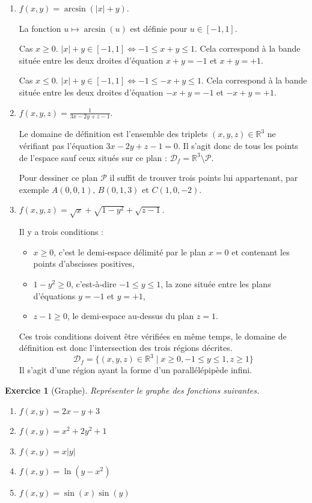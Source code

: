 \documentclass[11pt,a4paper]{article}
\newcommand{\Rr}{\mathbb{R}} \newcommand{\R}{\mathbb{R}}
\renewcommand{\ge}{\geqslant} \renewcommand{\geq}{\geqslant}
\renewcommand{\le}{\leqslant} \renewcommand{\leq}{\leqslant}
\theoremstyle{exostyle}
\newtheorem{exo}{Exercice}
\newcommand{\exercice}[1]{} \newcommand{\finexercice}{}
\newcommand{\enonce}{\begin{exo}} \newcommand{\finenonce}{\end{exo}}
\begin{document}
\begin{enumerate}
	\item $f(x,y) = \arcsin(|x| + y)$.	
	
	La fonction $u \mapsto \arcsin(u)$ est définie pour $u \in [-1,1]$.
	
	Cas $x \ge 0$. $|x| + y \in [-1,1] \iff -1 \le x+y \le 1$. Cela correspond à la bande située entre les deux droites d'équation $x+y=-1$ et $x+y=+1$.
	
	Cas $x \le 0$. $|x| + y \in [-1,1] \iff -1 \le -x+y \le 1$. Cela correspond à la bande située entre les deux droites d'équation $-x+y=-1$ et $-x+y=+1$.	
	
	
	
	
	\item $f(x,y,z) = \frac{1}{3x-2y+z-1}$.
	
	Le domaine de définition est l'ensemble des triplets $(x,y,z) \in \Rr^3$ ne vérifiant pas l'équation $3x-2y+z-1=0$. Il s'agit donc de tous les points de l'espace sauf ceux situés sur ce plan : $\mathcal{D}_f = \Rr^3 \setminus \mathcal{P}$.
	
	Pour dessiner ce plan $\mathcal{P}$ il suffit de trouver trois points lui appartenant, par exemple $A(0,0,1)$, $B(0,1,3)$ et $C(1,0,-2)$.
	
		
	\item $f(x,y,z) = \sqrt{x} + \sqrt{1-y^2} + \sqrt{z-1}$.
	
	Il y a trois conditions : 
	\begin{itemize}
		\item $x\ge0$, c'est le demi-espace délimité par le plan $x=0$ et contenant les points d'abscisses positives,
		\item $1-y^2\ge0$, c'est-à-dire $-1 \le y \le 1$, la zone située entre les plans d'équations $y=-1$ et $y=+1$,
		\item $z-1 \ge 0$, le demi-espace au-dessus du plan $z=1$.
	\end{itemize}
	Ces trois conditions doivent être vérifiées en même temps, le domaine de définition est donc l'intersection des trois régions décrites.
	\[ \mathcal{D}_f = \big\lbrace 
	(x,y,z) \in \Rr^3 \mid x\ge0, -1 \le y \le 1, z\ge1 
	\big\rbrace
	\]
	Il s'agit d'une région ayant la forme d'un parallélépipède infini. 
\end{enumerate}
\fincorrection
\finexercice

	
\exercice{}
\enonce[Graphe]
Représenter le graphe des fonctions suivantes.
\begin{enumerate}
	\item $f(x,y) = 2x - y + 3$
	\item $f(x,y) = x^2 + 2y^2+1$
	\item $f(x,y) = x |y|$
	\item $f(x,y) = \ln(y - x^2)$
	\item $f(x,y) = \sin(x)\sin(y)$
\end{enumerate}
\finenonce
\end{document}
